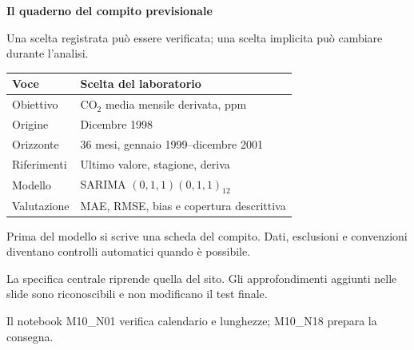 \documentclass[12pt,aspectratio=1610]{beamer}
\newcommand{\PBody}[1]{\par{\fontsize{11.3}{14.8}\selectfont #1\par}}
\newcommand{\PSmall}[1]{\par{\fontsize{9.8}{13.1}\selectfont #1\par}}
\newcommand{\PInfo}[1]{%
\begin{tcolorbox}[enhanced,arc=1.6mm,boxrule=.55pt,colback=GeoTint,
 colframe=Rule!80!Classical,left=2.3mm,right=2.3mm,top=2mm,bottom=2mm,
 before skip=1mm,after skip=1mm]
\PSmall{#1}\end{tcolorbox}}
\begin{document}
\begin{frame}[plain]\hypertarget{slide10}{}
\begin{lrbox}{\TitleBox}
\begin{minipage}[t]{17.7cm}\raggedright\color{Ink}\fontsize{11.3}{14.8}\selectfont
\color{Navy}\bfseries\fontsize{20.6}{24.5}\selectfont Il quaderno del compito previsionale
\end{minipage}\end{lrbox}

\begin{lrbox}{\RecallBox}
\begin{minipage}[t]{14.3cm}\raggedright\color{Ink}\fontsize{11.3}{14.8}\selectfont
\fontsize{10.3}{13.8}\selectfont Una scelta registrata può essere verificata; una scelta implicita può cambiare durante l’analisi.
\end{minipage}\end{lrbox}

\begin{lrbox}{\PilotLeftBox}
\begin{minipage}[t]{10.05cm}\raggedright\color{Ink}\fontsize{11.3}{14.8}\selectfont
{\fontsize{10.2}{13.1}\selectfont\renewcommand{\arraystretch}{1.45}\begin{tabular}{@{}p{2.6cm}p{6.5cm}@{}}\toprule
\textbf{Voce} & \textbf{Scelta del laboratorio}\\\midrule
Obiettivo & CO$_2$ media mensile derivata, ppm\\
Origine & Dicembre 1998\\
Orizzonte & 36 mesi, gennaio 1999--dicembre 2001\\
Riferimenti & Ultimo valore, stagione, deriva\\
Modello & SARIMA $(0,1,1)(0,1,1)_{12}$\\
Valutazione & MAE, RMSE, bias e copertura descrittiva\\
\bottomrule\end{tabular}}

\end{minipage}\end{lrbox}

\begin{lrbox}{\PilotRightBox}
\begin{minipage}[t]{7.55cm}\raggedright\color{Ink}\fontsize{11.3}{14.8}\selectfont
\PBody{Prima del modello si scrive una scheda del compito. Dati, esclusioni e convenzioni diventano controlli automatici quando è possibile.}
\vspace{2.5mm}
\PInfo{La specifica centrale riprende quella del sito. Gli approfondimenti aggiunti nelle slide sono riconoscibili e non modificano il test finale.}
\PSmall{Il notebook M10\_N01 verifica calendario e lunghezze; M10\_N18 prepara la consegna.}


\end{minipage}
\end{lrbox}
\end{frame}
\end{document}
